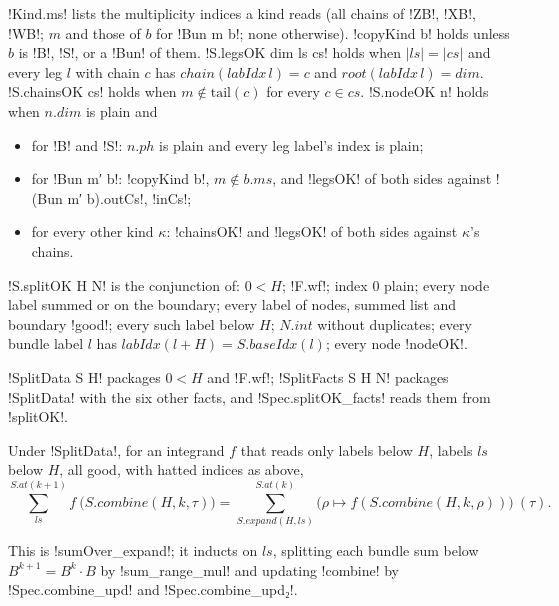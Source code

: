 {\begin{definition}\label{def:boxes-splitok}
\lbx!Kind.ms! lists the multiplicity indices a kind reads (all chains of \lbx!ZB!, \lbx!XB!, \lbx!WB!; $m$ and those of $b$ for \lbx!Bun m b!; none otherwise). \lbx!copyKind b! holds unless $b$ is \lbx!B!, \lbx!S!, or a \lbx!Bun! of them. \lbx!S.legsOK dim ls cs! holds when $|ls|=|cs|$ and every leg $l$ with chain $c$ has $\mathit{chain}(\mathit{labIdx}\,l)=c$ and $\mathit{root}(\mathit{labIdx}\,l)=\mathit{dim}$. \lbx!S.chainsOK cs! holds when $m\notin\mathrm{tail}(c)$ for every $c\in cs$. \lbx!S.nodeOK n! holds when $n.\mathit{dim}$ is plain and
\begin{itemize}
\item for \lbx!B! and \lbx!S!: $n.\mathit{ph}$ is plain and every leg label's index is plain;
\item for \lbx!Bun m′ b!: \lbx!copyKind b!, $m\notin b.\mathit{ms}$, and \lbx!legsOK! of both sides against \lbx!(Bun m′ b).outCs!, \lbx!inCs!;
\item for every other kind $\kappa$: \lbx!chainsOK! and \lbx!legsOK! of both sides against $\kappa$'s chains.
\end{itemize}
\lbx!S.splitOK H N! is the conjunction of: $0<H$; \lbx!F.wf!; index $0$ plain; every node label summed or on the boundary; every label of nodes, summed list and boundary \lbx!good!; every such label below $H$; $N.\mathit{int}$ without duplicates; every bundle label $l$ has $\mathit{labIdx}(l+H)=S.\mathit{baseIdx}(l)$; every node \lbx!nodeOK!.
\end{definition}

\lbx!SplitData S H! packages $0<H$ and \lbx!F.wf!; \lbx!SplitFacts S H N! packages \lbx!SplitData! with the six other facts, and \lbx!Spec.splitOK_facts! reads them from \lbx!splitOK!.

\begin{lemma}\label{lem:boxes-sumOver-expand}
Under \lbx!SplitData!, for an integrand $f$ that reads only labels below $H$, labels $ls$ below $H$, all good, with hatted indices as above,
\[
\textstyle\sum^{S.\mathit{at}(k+1)}_{ls} f\ \bigl(S.\mathit{combine}(H,k,\tau)\bigr)=\sum^{S.\mathit{at}(k)}_{S.\mathit{expand}(H,ls)} \bigl(\rho\mapsto f(S.\mathit{combine}(H,k,\rho))\bigr)\ (\tau).
\]
\end{lemma}
\noindent This is \lbx!sumOver_expand!; it inducts on $ls$, splitting each bundle sum below $B^{k+1}=B^k\cdot B$ by \lbx!sum_range_mul! and updating \lbx!combine! by \lbx!Spec.combine_upd! and \lbx!Spec.combine_upd₂!.

}
